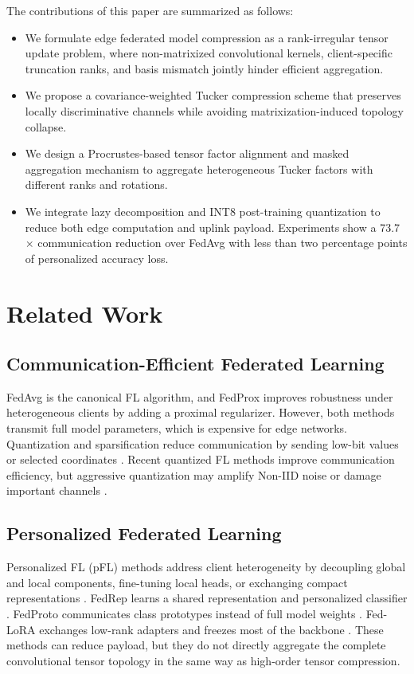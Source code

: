 \documentclass[conference]{IEEEtran}
\begin{document}
The contributions of this paper are summarized as follows:
\begin{itemize}
    \item We formulate edge federated model compression as a rank-irregular tensor update problem, where non-matrixized convolutional kernels, client-specific truncation ranks, and basis mismatch jointly hinder efficient aggregation.
    \item We propose a covariance-weighted Tucker compression scheme that preserves locally discriminative channels while avoiding matrixization-induced topology collapse.
    \item We design a Procrustes-based tensor factor alignment and masked aggregation mechanism to aggregate heterogeneous Tucker factors with different ranks and rotations.
    \item We integrate lazy decomposition and INT8 post-training quantization to reduce both edge computation and uplink payload. Experiments show a 73.7$\times$ communication reduction over FedAvg with less than two percentage points of personalized accuracy loss.
\end{itemize}


\section{Related Work}
\subsection{Communication-Efficient Federated Learning}
FedAvg \cite{mcmahan2017fedavg} is the canonical FL algorithm, and FedProx \cite{li2020fedprox} improves robustness under heterogeneous clients by adding a proximal regularizer. However, both methods transmit full model parameters, which is expensive for edge networks. Quantization and sparsification reduce communication by sending low-bit values or selected coordinates \cite{alistarh2017qsgd,mao2022adaptivequant}. Recent quantized FL methods improve communication efficiency, but aggressive quantization may amplify Non-IID noise or damage important channels \cite{chen2024mixedprecision}.

\subsection{Personalized Federated Learning}
Personalized FL (pFL) methods address client heterogeneity by decoupling global and local components, fine-tuning local heads, or exchanging compact representations \cite{tan2022pfl}. FedRep learns a shared representation and personalized classifier \cite{collins2021fedrep}. FedProto communicates class prototypes instead of full model weights \cite{tan2022fedproto}. Fed-LoRA exchanges low-rank adapters and freezes most of the backbone \cite{cho2023fedlora}. These methods can reduce payload, but they do not directly aggregate the complete convolutional tensor topology in the same way as high-order tensor compression.
\end{document}
